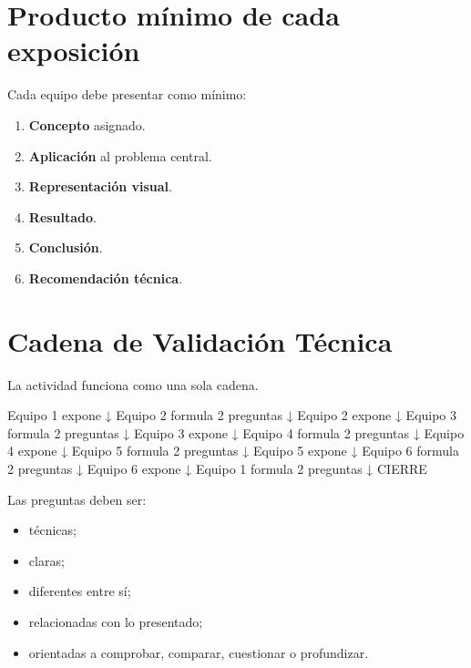 \documentclass[
  spanish,
  letterpaper,
]{scrbook}
\newenvironment{Shaded}{\begin{snugshade}}{\end{snugshade}}
\newcommand{\NormalTok}[1]{\textcolor[rgb]{0.00,0.23,0.31}{#1}}
\providecommand{\tightlist}{%
  \setlength{\itemsep}{0pt}\setlength{\parskip}{0pt}}
\begin{document}

\chapter{Producto mínimo de cada
exposición}\label{producto-muxednimo-de-cada-exposiciuxf3n}

Cada equipo debe presentar como mínimo:

\begin{enumerate}
\def\labelenumi{\arabic{enumi}.}
\tightlist
\item
  \textbf{Concepto} asignado.
\item
  \textbf{Aplicación} al problema central.
\item
  \textbf{Representación visual}.
\item
  \textbf{Resultado}.
\item
  \textbf{Conclusión}.
\item
  \textbf{Recomendación técnica}.
\end{enumerate}


\chapter{Cadena de Validación
Técnica}\label{cadena-de-validaciuxf3n-tuxe9cnica}

La actividad funciona como una sola cadena.

\begin{Shaded}
\begin{Highlighting}[]
\NormalTok{Equipo 1 expone}
\NormalTok{      ↓}
\NormalTok{Equipo 2 formula 2 preguntas}
\NormalTok{      ↓}
\NormalTok{Equipo 2 expone}
\NormalTok{      ↓}
\NormalTok{Equipo 3 formula 2 preguntas}
\NormalTok{      ↓}
\NormalTok{Equipo 3 expone}
\NormalTok{      ↓}
\NormalTok{Equipo 4 formula 2 preguntas}
\NormalTok{      ↓}
\NormalTok{Equipo 4 expone}
\NormalTok{      ↓}
\NormalTok{Equipo 5 formula 2 preguntas}
\NormalTok{      ↓}
\NormalTok{Equipo 5 expone}
\NormalTok{      ↓}
\NormalTok{Equipo 6 formula 2 preguntas}
\NormalTok{      ↓}
\NormalTok{Equipo 6 expone}
\NormalTok{      ↓}
\NormalTok{Equipo 1 formula 2 preguntas}
\NormalTok{      ↓}
\NormalTok{CIERRE}
\end{Highlighting}
\end{Shaded}

Las preguntas deben ser:

\begin{itemize}
\tightlist
\item
  técnicas;
\item
  claras;
\item
  diferentes entre sí;
\item
  relacionadas con lo presentado;
\item
  orientadas a comprobar, comparar, cuestionar o profundizar.
\end{itemize}
\end{document}
